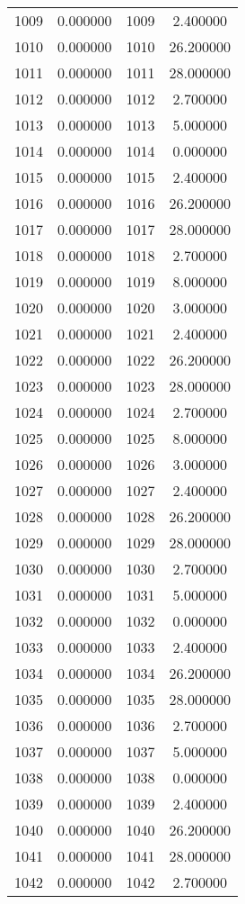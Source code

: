 \documentclass[12pt]{article}
\begin{document}
\begin{longtable}{@{}cccc@{}}
1009 & 0.000000 & 1009 & 2.400000 \\
1010 & 0.000000 & 1010 & 26.200000 \\
1011 & 0.000000 & 1011 & 28.000000 \\
1012 & 0.000000 & 1012 & 2.700000 \\
1013 & 0.000000 & 1013 & 5.000000 \\
1014 & 0.000000 & 1014 & 0.000000 \\
1015 & 0.000000 & 1015 & 2.400000 \\
1016 & 0.000000 & 1016 & 26.200000 \\
1017 & 0.000000 & 1017 & 28.000000 \\
1018 & 0.000000 & 1018 & 2.700000 \\
1019 & 0.000000 & 1019 & 8.000000 \\
1020 & 0.000000 & 1020 & 3.000000 \\
1021 & 0.000000 & 1021 & 2.400000 \\
1022 & 0.000000 & 1022 & 26.200000 \\
1023 & 0.000000 & 1023 & 28.000000 \\
1024 & 0.000000 & 1024 & 2.700000 \\
1025 & 0.000000 & 1025 & 8.000000 \\
1026 & 0.000000 & 1026 & 3.000000 \\
1027 & 0.000000 & 1027 & 2.400000 \\
1028 & 0.000000 & 1028 & 26.200000 \\
1029 & 0.000000 & 1029 & 28.000000 \\
1030 & 0.000000 & 1030 & 2.700000 \\
1031 & 0.000000 & 1031 & 5.000000 \\
1032 & 0.000000 & 1032 & 0.000000 \\
1033 & 0.000000 & 1033 & 2.400000 \\
1034 & 0.000000 & 1034 & 26.200000 \\
1035 & 0.000000 & 1035 & 28.000000 \\
1036 & 0.000000 & 1036 & 2.700000 \\
1037 & 0.000000 & 1037 & 5.000000 \\
1038 & 0.000000 & 1038 & 0.000000 \\
1039 & 0.000000 & 1039 & 2.400000 \\
1040 & 0.000000 & 1040 & 26.200000 \\
1041 & 0.000000 & 1041 & 28.000000 \\
1042 & 0.000000 & 1042 & 2.700000 \\

\end{longtable}
\end{document}
